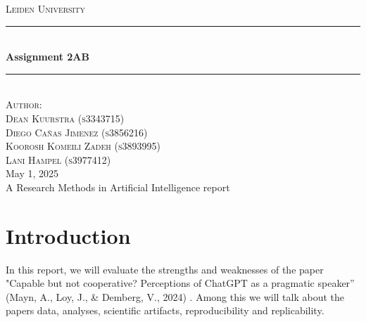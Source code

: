 \documentclass[12pt]{article}
\begin{document}

\begin{titlepage}

\newcommand{\HRule}{\rule{\linewidth}{0.5mm}}

\center
\begin{figure}[H]  \end{figure}
\textsc{\LARGE Leiden University}\\[1.5cm]


\HRule \\[0.9cm]
{ \huge \bfseries Assignment 2AB}\\[0.1cm] %
\HRule \\[1.5cm]

\textsc{Author:}\\[0.3cm]
\textsc{\Large Dean Kuurstra (s3343715)}\\[0.5cm]
\textsc{\Large Diego Cañas Jimenez (s3856216)}\\[0.5cm]
\textsc{\Large Koorosh Komeili Zadeh (s3893995)}\\[0.5cm]
\textsc{\Large Lani Hampel (s3977412)}\\[0.5cm]

\large May 1, 2025\\
A Research Methods in Artificial Intelligence report\\

\vfill %

\end{titlepage}

\newpage
\section{Introduction}
In this report, we will evaluate the strengths and weaknesses of the paper "Capable but not cooperative? Perceptions of ChatGPT as a pragmatic speaker” (Mayn, A., Loy, J., \& Demberg, V., 2024) \cite{pragmatic_gpt}. Among this we will talk about the papers data, analyses, scientific artifacts, reproducibility and replicability.
\end{document}
